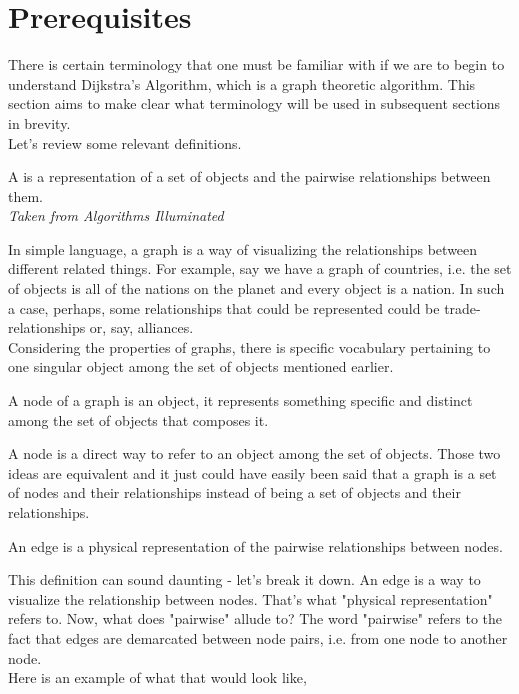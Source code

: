 
\section{Prerequisites}

There is certain terminology that one must be familiar with if we are to begin to understand Dijkstra's Algorithm, which is a graph theoretic algorithm. This section aims to make clear what terminology will be used in subsequent sections in brevity.\\

Let's review some relevant definitions.

\begin{defn}
A  is a representation of a set of objects and the pairwise relationships between them. \\ \textit{Taken from Algorithms Illuminated}
\end{defn}

In simple language, a graph is a way of visualizing the relationships between different related things. For example, say we have a graph of countries, i.e. the set of objects is all of the nations on the planet and every object is a nation. In such a case, perhaps, some relationships that could be represented could be trade-relationships or, say, alliances.  \\

Considering the properties of graphs, there is specific vocabulary pertaining to one singular object among the set of objects mentioned earlier.  
\begin{defn}
A node of a graph is an object, it represents something specific and distinct among the set of objects that composes it.
\end{defn}

A node is a direct way to refer to an object among the set of objects. Those two ideas are equivalent and it just could have easily been said that a graph is a set of nodes and their relationships instead of being a set of objects and their relationships.

\begin{defn}
An edge is a physical representation of the pairwise relationships between nodes.
\end{defn}

This definition can sound daunting - let's break it down. An edge is a way to visualize the relationship between nodes. That's what "physical representation" refers to. Now, what does "pairwise" allude to? The word "pairwise" refers to the fact that edges are demarcated between node pairs, i.e. from one node to another node. \\

Here is an example of what that would look like,

